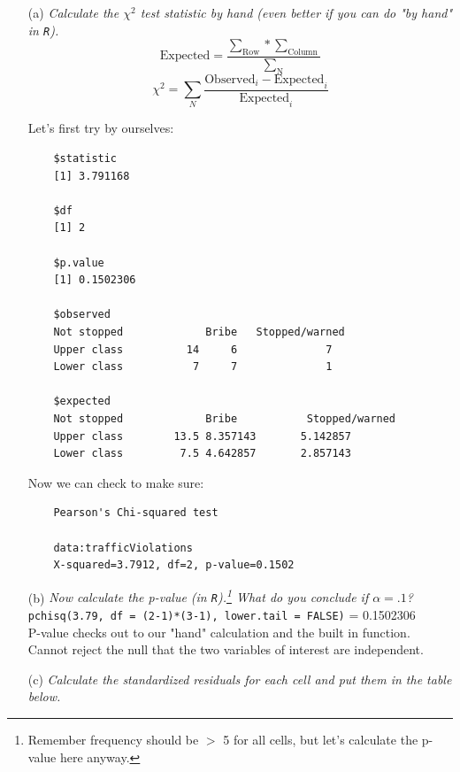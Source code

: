\documentclass[12pt,letterpaper]{article}
\begin{document}
\begin{enumerate}
	
	\newpage
	\item [(a)]
	\textit{Calculate the $\chi^2$ test statistic by hand (even better if you can do "by hand" in \texttt{R}).}\\
	
	
	$$\text{Expected} =\frac{\sum_{\text{Row}}*\sum_{\text{Column}}}{\sum_{\text{N}}}$$
	$$\chi^2 = \sum_N \frac{\text{Observed}_i - \text{Expected}_i}{\text{Expected}_i}$$
	
	Let's first try by ourselves:		
	
	  
	\footnotesize
	\begin{verbatim}
	$statistic
	[1] 3.791168
	
	$df
	[1] 2
	
	$p.value
	[1] 0.1502306
	
	$observed
	Not stopped 			Bribe 	Stopped/warned
	Upper class          14     6              7
	Lower class           7     7              1
	
	$expected
	Not stopped   			Bribe 			Stopped/warned
	Upper class        13.5 8.357143       5.142857
	Lower class         7.5 4.642857       2.857143
	\end{verbatim}
	\normalsize
	Now we can check to make sure:
	
	  
	\footnotesize
	\begin{verbatim}
	Pearson's Chi-squared test
	
	data:trafficViolations
	X-squared=3.7912, df=2, p-value=0.1502
	\end{verbatim}
	\normalsize
	\item [(b)]
	\textit{Now calculate the p-value (in \texttt{R}).\footnote{Remember frequency should be $>$ 5 for all cells, but let's calculate the p-value here anyway.}  What do you conclude if $\alpha = .1$?}\\
	
	\texttt{pchisq(3.79, df = (2-1)*(3-1), lower.tail = FALSE)} = 0.1502306\\

	P-value checks out to our "hand" calculation and the built in function. Cannot reject the null that the two variables of interest are independent.\\
	
			\vspace{.25cm}
	\item [(c)] \textit{Calculate the standardized residuals for each cell and put them in the table below.}\\
	

\end{enumerate}
\end{document}
